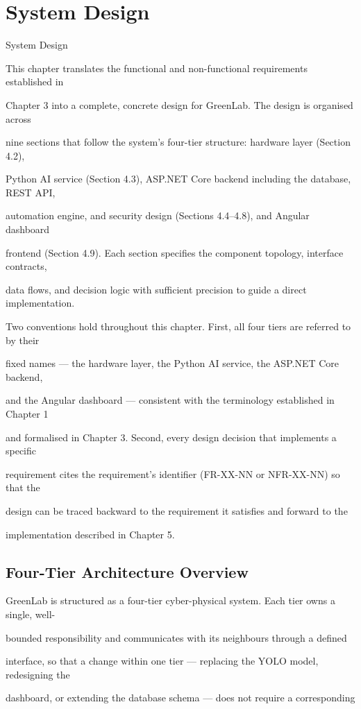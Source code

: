 \chapter{System Design}
System Design

This chapter translates the functional and non-functional requirements established in

Chapter 3 into a complete, concrete design for GreenLab. The design is organised across

nine sections that follow the system's four-tier structure: hardware layer (Section 4.2),

Python AI service (Section 4.3), ASP.NET Core backend including the database, REST API,

automation engine, and security design (Sections 4.4--4.8), and Angular dashboard

frontend (Section 4.9). Each section specifies the component topology, interface contracts,

data flows, and decision logic with sufficient precision to guide a direct implementation.

Two conventions hold throughout this chapter. First, all four tiers are referred to by their

fixed names --- the hardware layer, the Python AI service, the ASP.NET Core backend,

and the Angular dashboard --- consistent with the terminology established in Chapter 1

and formalised in Chapter 3. Second, every design decision that implements a specific

requirement cites the requirement's identifier (FR-XX-NN or NFR-XX-NN) so that the

design can be traced backward to the requirement it satisfies and forward to the

implementation described in Chapter 5.


\section{Four-Tier Architecture Overview}
GreenLab is structured as a four-tier cyber-physical system. Each tier owns a single, well-

bounded responsibility and communicates with its neighbours through a defined

interface, so that a change within one tier --- replacing the YOLO model, redesigning the

dashboard, or extending the database schema --- does not require a corresponding

